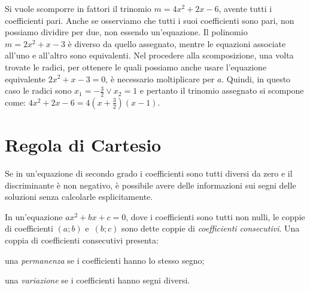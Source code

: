 \osservazione
Si vuole scomporre in fattori il trinomio $m = 4 x^{2} + 2 x - 6$, avente tutti i coefficienti pari. Anche se osserviamo che tutti i suoi coefficienti sono pari, non possiamo dividire per due, non essendo un'equazione. Il polinomio $m = 2 x^{2} + x - 3$ è diverso da quello assegnato, mentre le equazioni associate all'uno e all'altro sono equivalenti. Nel procedere alla scomposizione, una volta trovate le radici, per ottenere le quali possiamo anche usare l'equazione equivalente $2 x^{2} + x - 3 = 0$, è necessario moltiplicare per $a$. Quindi, in questo caso le radici sono $x_{1} = - \frac{3}{2} \vee x_{2} = 1$ e pertanto il trinomio assegnato si scompone come: $4 x^{2} + 2 x - 6 = 4 \left( x + \frac{3}{2} \right) ( x - 1)$.

\vspazio\ovalbox{\risolvii \ref{ese:3.84}, \ref{ese:3.85}, \ref{ese:3.86}, \ref{ese:3.87}}

\section{Regola di Cartesio}

Se in un'equazione di secondo grado i coefficienti sono tutti diversi da zero e il discriminante è non negativo, è possibile avere delle informazioni sui
segni delle soluzioni senza calcolarle esplicitamente.

In un'equazione $a x^{2} + b x + c = 0$, dove i coefficienti sono tutti non nulli, le coppie di coefficienti $(a;b)$ e~$(b;c)$ sono dette coppie di \emph{coefficienti consecutivi}. Una coppia di coefficienti consecutivi presenta:
\begin{itemize*}
\item una \emph{permanenza} se i coefficienti hanno lo stesso segno;
\item una \emph{variazione} se i coefficienti hanno segni diversi.
\end{itemize*}


